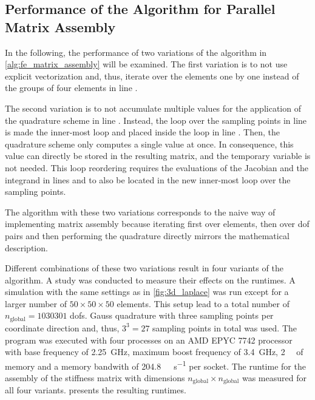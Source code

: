 
\subsection{Performance of the Algorithm for Parallel Matrix Assembly}\label{sec:performance_of_the_algorithm_for_pma}

In the following, the performance of two variations of the algorithm in \cref{alg:fe_matrix_assembly} will be examined. The first variation is to not use explicit vectorization and, thus, iterate over the elements one by one instead of the groups of four elements in line .

The second variation is to not accumulate multiple values for the application of the quadrature scheme in line . Instead, the loop over the sampling points in line  is made the inner-most loop and placed inside  the loop in line . Then, the quadrature scheme only computes a single value at once. In consequence, this value can directly be stored in the resulting matrix, and the temporary variable  is not needed. This loop reordering requires the evaluations of the Jacobian and the integrand in lines  and  to also be located in the new inner-most loop over the sampling points. 

The algorithm with these two variations corresponds to the naive way of implementing matrix assembly because iterating first over elements, then over dof pairs and then performing the quadrature directly mirrors the mathematical description.

Different combinations of these two variations result in four variants of the algorithm. A study was conducted to measure their effects on the runtimes. A simulation with the same settings as in \cref{fig:3d_laplace} was run except for a larger number of $50 \times 50 \times 50$ elements. This setup lead to a total number of $n_\text{global}=\num{1030301}$ dofs. Gauss quadrature with three sampling points per coordinate direction and, thus, $3^3=27$ sampling points in total was used. The program was executed with four processes on an AMD EPYC 7742 processor with base frequency of \SI{2.25}{\giga\hertz}, maximum boost frequency of \SI{3.4}{\giga\hertz}, \SI{2}{\tera\byte} of memory and a memory bandwith of \SI{204.8}{\giga\byte\per\second} per socket.
The runtime for the assembly of the stiffness matrix with dimensions $n_\text{global} \times n_\text{global}$ was measured for all four variants.  presents the resulting runtimes.

